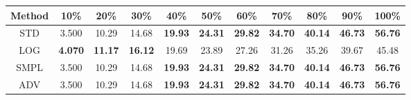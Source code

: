 \documentclass{standalone}
\begin{document}
\begin{tabular}{c|cccccccccc}
      \toprule
      Method & 10\% & 20\% & 30\% & 40\% & 50\% & 60\% & 70\% & 80\% & 90\% & 100\% \\
      \midrule
STD & 3.500 & 10.29 & 14.68 & \textbf{19.93} & \textbf{24.31} & \textbf{29.82} & \textbf{34.70} & \textbf{40.14} & \textbf{46.73} & \textbf{56.76}\\
LOG & \textbf{4.070} & \textbf{11.17} & \textbf{16.12} & 19.69 & 23.89 & 27.26 & 31.26 & 35.26 & 39.67 & 45.48\\
SMPL & 3.500 & 10.29 & 14.68 & \textbf{19.93} & \textbf{24.31} & \textbf{29.82} & \textbf{34.70} & \textbf{40.14} & \textbf{46.73} & \textbf{56.76}\\
ADV & 3.500 & 10.29 & 14.68 & \textbf{19.93} & \textbf{24.31} & \textbf{29.82} & \textbf{34.70} & \textbf{40.14} & \textbf{46.73} & \textbf{56.76}\\
  \bottomrule
\end{tabular}
\end{document}
